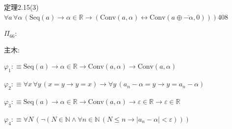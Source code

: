 \begin{fullproof}{定理2.15(3)}{$\forall a\,\forall \alpha\,(\mathrm{Seq}(a) \to \alpha \in \mathbb{R} \to (\mathrm{Conv}(a,\alpha) \leftrightarrow \mathrm{Conv}(a \oplus \overline{-\alpha},0)))$}{408}
\begin{ptree}
\noLine
{}
\end{ptree}
\noindent$\Pi_{66}$:
\begin{ptree}
\noLine
{}
\noLine
{}
\end{ptree}
\noindent 主木:
\begin{ptree}
\noLine
{}
\noLine
{}
\noLine
{}
\end{ptree}
\begin{abbrevlist}
\item $\varphi_{1} :\equiv \mathrm{Seq}(a) \to \alpha \in \mathbb{R} \to \mathrm{Conv}(a,\alpha) \to \mathrm{Conv}(a,\alpha)$
\item $\varphi_{2} :\equiv \forall x\,\forall y\,(x = y \to y = x) \to \forall y\,(a_{n} - \alpha = y \to y = a_{n} - \alpha)$
\item $\varphi_{3} :\equiv \mathrm{Seq}(a) \to \alpha \in \mathbb{R} \to \mathrm{Conv}(a,\alpha) \to \varepsilon \in \mathbb{R} \to \varepsilon \in \mathbb{R}$
\item $\varphi_{4} :\equiv \forall N\,(\neg (N \in \mathbb{N} \land \forall n \in \mathbb{N}\,(N \leq n \to \lvert a_{n} - \alpha \rvert < \varepsilon)))$

\end{abbrevlist}
\end{fullproof}
